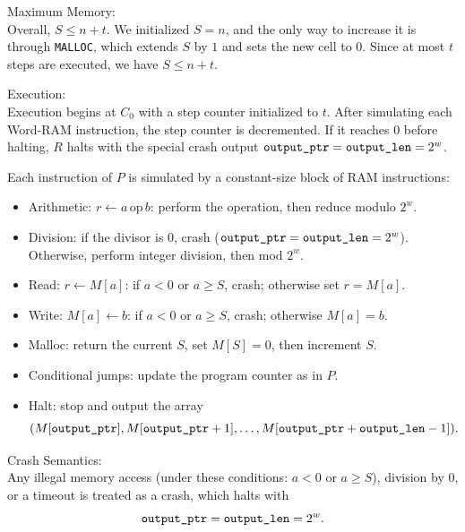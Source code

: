 \documentclass[11pt]{article}
\begin{document}
\begin{enumerate}
\vspace{1em}

Maximum Memory: \\
Overall, $S \leq n + t$. We initialized $S = n$, and the only way to increase it is through \texttt{MALLOC}, which extends $S$ by $1$ and sets the new cell to $0$. 
Since at most $t$ steps are executed, we have $S \leq n + t$. 

\vspace{1em}

Execution: \\

Execution begins at $C_0$ with a step counter initialized to $t$. After simulating each Word-RAM instruction, the step counter is decremented. 
If it reaches $0$ before halting, $R$ halts with the special crash output $\texttt{output\_ptr} = \texttt{output\_len} = 2^w$. 

Each instruction of $P$ is simulated by a constant-size block of RAM instructions:
\begin{itemize}
    \item Arithmetic: $r \gets a \,\text{op}\, b$: perform the operation, then reduce modulo $2^w$.  
    \item Division: if the divisor is $0$, crash ($\texttt{output\_ptr} = \texttt{output\_len} = 2^w$). Otherwise, perform integer division, then mod $2^w$.  
    \item Read: $r \gets M[a]$: if $a < 0$ or $a \geq S$, crash; otherwise set $r = M[a]$.  
    \item Write: $M[a] \gets b$: if $a < 0$ or $a \geq S$, crash; otherwise $M[a] = b$.  
    \item Malloc: return the current $S$, set $M[S] = 0$, then increment $S$.  
    \item Conditional jumps: update the program counter as in $P$.  
    \item Halt: stop and output the array
    \[
    (M[\texttt{output\_ptr}], M[\texttt{output\_ptr}+1], \dots, M[\texttt{output\_ptr}+\texttt{output\_len}-1]).
    \]
\end{itemize}

\vspace{1em}

Crash Semantics: \\
Any illegal memory access (under these conditions: $a < 0$ or $a \geq S$), division by $0$, or a timeout is treated as a crash, which halts with
\[
\texttt{output\_ptr} = \texttt{output\_len} = 2^w.
\]

\vspace{1em}


\end{enumerate}
\end{document}
